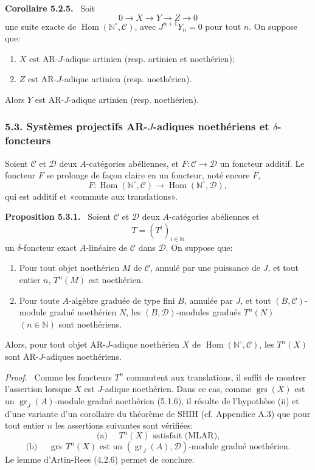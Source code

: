 \documentclass[11pt]{article}
\newenvironment{statement}[1]{\par\medskip\noindent\textbf{#1.}\ }{\par\medskip}
\newenvironment{prooftext}[1][Proof]{\par\noindent\emph{#1.}\ }{\par\medskip}
\DeclareMathOperator{\Hom}{Hom}
\providecommand{\gr}{\operatorname{gr}}
\providecommand{\Hom}{\operatorname{Hom}}
\providecommand{\gr}{\operatorname{gr}}
\providecommand{\gr}{\operatorname{gr}}
\providecommand{\grs}{\operatorname{grs}}
\providecommand{\Hom}{\operatorname{Hom}}
\begin{document}
\begin{statement}{Corollaire 5.2.5}
Soit
\[
0\longrightarrow X\longrightarrow Y\longrightarrow Z\longrightarrow0
\]
une suite exacte de \(\Hom(\mathbb N^\circ,\mathcal C)\), avec \(J^{n+1}Y_n=0\) pour tout \(n\). On suppose que:
\begin{enumerate}[label=\textup{(\roman*)}]
\item \(X\) est AR-\(J\)-adique artinien (resp. artinien et noethérien);
\item \(Z\) est AR-\(J\)-adique artinien (resp. noethérien).
\end{enumerate}
Alors \(Y\) est AR-\(J\)-adique artinien (resp. noethérien).
\end{statement}

\subsubsection*{5.3. Systèmes projectifs AR-\(J\)-adiques noethériens et \(\delta\)-foncteurs}

Soient \(\mathcal C\) et \(\mathcal D\) deux \(A\)-catégories abéliennes, et \(F:\mathcal C\to\mathcal D\) un foncteur additif. Le foncteur \(F\) se prolonge de façon claire en un foncteur, noté encore \(F\),
\[
F:\Hom(\mathbb N^\circ,\mathcal C)\longrightarrow\Hom(\mathbb N^\circ,\mathcal D),
\]
qui est additif et «commute aux translations».

\begin{statement}{Proposition 5.3.1}
Soient \(\mathcal C\) et \(\mathcal D\) deux \(A\)-catégories abéliennes et
\[
T=(T^i)_{i\in\mathbb N}
\]
un \(\delta\)-foncteur exact \(A\)-linéaire de \(\mathcal C\) dans \(\mathcal D\). On suppose que:
\begin{enumerate}[label=\textup{(\roman*)}]
\item Pour tout objet noethérien \(M\) de \(\mathcal C\), annulé par une puissance de \(J\), et tout entier \(n\), \(T^n(M)\) est noethérien.
\item Pour toute \(A\)-algèbre graduée de type fini \(B\), annulée par \(J\), et tout \((B,\mathcal C)\)-module gradué noethérien \(N\), les \((B,\mathcal D)\)-modules gradués \(T^n(N)\) \((n\in\mathbb N)\) sont noethériens.
\end{enumerate}
Alors, pour tout objet AR-\(J\)-adique noethérien \(X\) de \(\Hom(\mathbb N^\circ,\mathcal C)\), les \(T^n(X)\) sont AR-\(J\)-adiques noethériens.
\end{statement}

\begin{prooftext}
Comme les foncteurs \(T^n\) commutent aux translations, il suffit de montrer l'assertion lorsque \(X\) est \(J\)-adique noethérien. Dans ce cas, comme \(\grs(X)\) est un \(\gr_J(A)\)-module gradué noethérien (5.1.6), il résulte de l'hypothèse (ii) et d'une variante d'un corollaire du théorème de SHIH (cf. Appendice A.3) que pour tout entier \(n\) les assertions suivantes sont vérifiées:
\[
\text{(a) }\quad T^n(X)\text{ satisfait (MLAR),}
\]
\[
\text{(b) }\quad \grs\,T^n(X)\text{ est un }(\gr_J(A),\mathcal D)\text{-module gradué noethérien.}
\]
Le lemme d'Artin-Rees (4.2.6) permet de conclure.
\end{prooftext}
\end{document}
